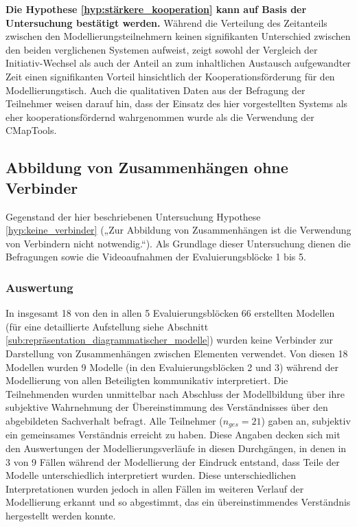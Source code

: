 \textbf{Die Hypothese \ref{hyp:stärkere_kooperation} kann auf Basis der Untersuchung bestätigt werden.} Während die Verteilung des Zeitanteils zwischen den Modellierungsteilnehmern keinen signifikanten Unterschied zwischen den beiden verglichenen Systemen aufweist, zeigt sowohl der Vergleich der Initiativ-Wechsel als auch der Anteil an zum inhaltlichen Austausch aufgewandter Zeit einen signifikanten Vorteil hinsichtlich der Kooperationsförderung für den Modellierungstisch. Auch die qualitativen Daten aus der Befragung der Teilnehmer weisen darauf hin, dass der Einsatz des hier vorgestellten Systems als eher kooperationsfördernd wahrgenommen wurde als die Verwendung der CMapTools.


\subsection{Abbildung von Zusammenhängen ohne Verbinder} %
\label{sub:abbildung_von_zusammenhängen_ohne_verbinder}

Gegenstand der hier beschriebenen Untersuchung Hypothese \ref{hyp:keine_verbinder} („Zur Abbildung von Zusammenhängen ist die Verwendung von Verbindern nicht notwendig.“). Als Grundlage dieser Untersuchung dienen die Befragungen sowie die Videoaufnahmen der Evaluierungsblöcke 1 bis 5.

\subsubsection{Auswertung} %

In insgesamt 18 von den in allen 5 Evaluierungsblöcken 66 erstellten Modellen (für eine detaillierte Aufstellung siehe Abschnitt \ref{sub:repräsentation_diagrammatischer_modelle}) wurden keine Verbinder zur Darstellung von Zusammenhängen zwischen Elementen verwendet. Von diesen 18 Modellen wurden 9 Modelle (in den Evaluierungsblöcken 2 und 3) während der Modellierung von allen Beteiligten kommunikativ interpretiert. Die Teilnehmenden wurden unmittelbar nach Abschluss der Modellbildung über ihre subjektive Wahrnehmung der Übereinstimmung des Verständnisses über den abgebildeten Sachverhalt befragt. Alle Teilnehmer ($n_{ges}=21$) gaben an, subjektiv ein gemeinsames Verständnis erreicht zu haben. Diese Angaben decken sich mit den Auswertungen der Modellierungsverläufe in diesen Durchgängen, in denen in 3 von 9 Fällen während der Modellierung der Eindruck entstand, dass Teile der Modelle unterschiedlich interpretiert wurden. Diese unterschiedlichen Interpretationen wurden jedoch in allen Fällen im weiteren Verlauf der Modellierung erkannt und so abgestimmt, das ein übereinstimmendes Verständnis hergestellt werden konnte.

